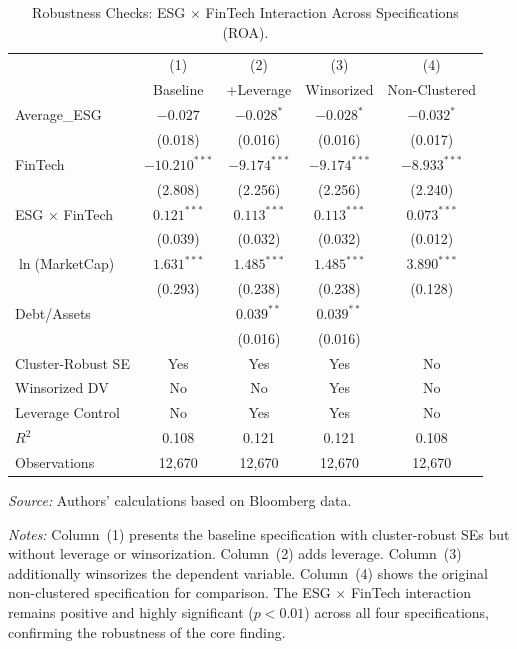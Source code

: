\documentclass[12pt]{article}
\begin{document}
\begin{table}[htbp]
\centering
\caption{Robustness Checks: ESG $\times$ FinTech Interaction Across Specifications (ROA).}\label{tab:robust}
\begin{threeparttable}
\begin{tabular}{lcccc}
\toprule
 & (1) & (2) & (3) & (4) \\
 & Baseline & +Leverage & Winsorized & Non-Clustered \\
\midrule
Average\_ESG & $-0.027$ & $-0.028^{*}$ & $-0.028^{*}$ & $-0.032^{*}$ \\
 & (0.018) & (0.016) & (0.016) & (0.017) \\
FinTech & $-10.210^{***}$ & $-9.174^{***}$ & $-9.174^{***}$ & $-8.933^{***}$ \\
 & (2.808) & (2.256) & (2.256) & (2.240) \\
ESG $\times$ FinTech & $0.121^{***}$ & $0.113^{***}$ & $0.113^{***}$ & $0.073^{***}$ \\
 & (0.039) & (0.032) & (0.032) & (0.012) \\
$\ln$(MarketCap) & $1.631^{***}$ & $1.485^{***}$ & $1.485^{***}$ & $3.890^{***}$ \\
 & (0.293) & (0.238) & (0.238) & (0.128) \\
Debt/Assets &  & $0.039^{**}$ & $0.039^{**}$ &  \\
 &  & (0.016) & (0.016) &  \\
\midrule
Cluster-Robust SE & Yes & Yes & Yes & No \\
Winsorized DV & No & No & Yes & No \\
Leverage Control & No & Yes & Yes & No \\
$R^2$ & 0.108 & 0.121 & 0.121 & 0.108 \\
Observations & 12{,}670 & 12{,}670 & 12{,}670 & 12{,}670 \\
\bottomrule
\end{tabular}
\begin{tablenotes}
\small
\item \textit{Source:} Authors' calculations based on Bloomberg data.
\item \textit{Notes:} Column~(1) presents the baseline specification with cluster-robust SEs but without leverage or winsorization. Column~(2) adds leverage. Column~(3) additionally winsorizes the dependent variable. Column~(4) shows the original non-clustered specification for comparison. The ESG $\times$ FinTech interaction remains positive and highly significant ($p < 0.01$) across all four specifications, confirming the robustness of the core finding.
\end{tablenotes}
\end{threeparttable}
\end{table}
\end{document}
